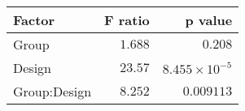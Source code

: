 \begin{tabular}{lrr}
\toprule
       Factor &  F ratio &               p value \\
\midrule
        Group &  $1.688$ &               $0.208$ \\
       Design &  $23.57$ & $8.455\times 10^{-5}$ \\
 Group:Design &  $8.252$ &            $0.009113$ \\
\bottomrule
\end{tabular}
